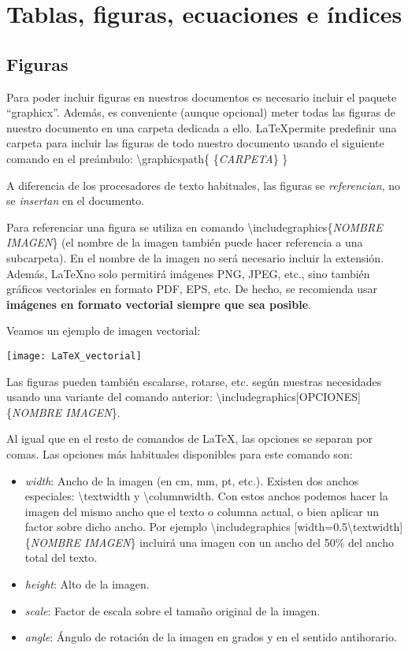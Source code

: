 \chapter{Tablas, figuras, ecuaciones e índices}

\section{Figuras}

Para poder incluir figuras en nuestros documentos es necesario incluir el paquete ``graphicx''. Además, es conveniente (aunque opcional) meter todas las figuras de nuestro documento en una carpeta dedicada a ello. \LaTeX permite predefinir una carpeta para incluir las figuras de todo nuestro documento usando el siguiente comando en el preámbulo: \textbackslash graphicspath\{ \{\emph{CARPETA}\} \}

A diferencia de los procesadores de texto habituales, las figuras se \emph{referencian}, no se \emph{insertan} en el documento.

Para referenciar una figura se utiliza en comando \textbackslash  includegraphics\{\emph{NOMBRE IMAGEN}\} (el nombre de la imagen también puede hacer referencia a una subcarpeta). En el nombre de la imagen no será necesario incluir la extensión. Además, \LaTeX no solo permitirá imágenes PNG, JPEG, etc., sino también gráficos vectoriales en formato PDF, EPS, etc. De hecho, se recomienda usar \textbf{imágenes en formato vectorial siempre que sea posible}.

Veamos un ejemplo de imagen vectorial:

\texttt{[image: LaTeX\_vectorial]}

Las figuras pueden también escalarse, rotarse, etc. según nuestras necesidades usando una variante del comando anterior: \textbackslash includegraphics[OPCIONES] \{\emph{NOMBRE IMAGEN}\}. 

Al igual que en el resto de comandos de \LaTeX, las opciones se separan por comas. Las opciones más habituales disponibles para este comando son:

\begin{itemize}
	\item \emph{width}: Ancho de la imagen (en cm, mm, pt, etc.). Existen dos anchos especiales: \textbackslash textwidth y \textbackslash columnwidth. Con estos anchos podemos hacer la imagen del mismo ancho que el texto o columna actual, o bien aplicar un factor sobre dicho ancho. Por ejemplo \textbackslash includegraphics [width=0.5\textbackslash textwidth]\{\emph{NOMBRE IMAGEN}\} incluirá una imagen con un ancho del 50\% del ancho total del texto.
	\item \emph{height}: Alto de la imagen.
	\item \emph{scale}: Factor de escala sobre el tamaño original de la imagen.
	\item \emph{angle}: Ángulo de rotación de la imagen en grados y en el sentido antihorario.
\end{itemize}

